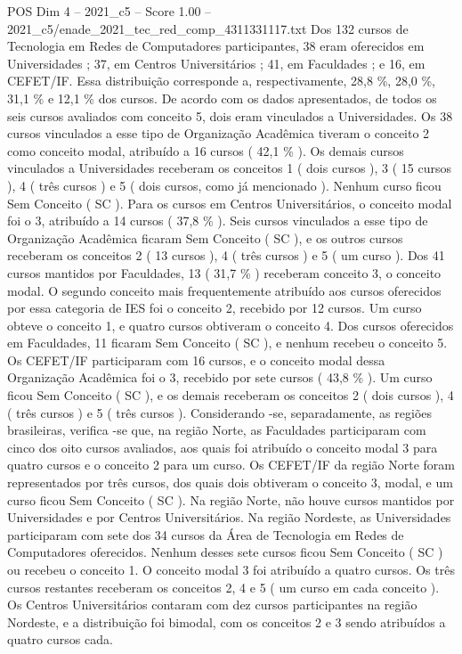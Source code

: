 \begin{textsample}{POS Dim 4 – 2021\_c5 – Score 1.00 – 2021\_c5/enade\_2021\_tec\_red\_comp\_4311331117.txt}
Dos 132 cursos de Tecnologia em Redes de Computadores participantes, 38 eram oferecidos em Universidades ; 37, em Centros Universitários ; 41, em Faculdades ; e 16, em CEFET/IF.
Essa distribuição corresponde a, respectivamente, 28,8 \%, 28,0 \%, 31,1 \% e 12,1 \% dos cursos.
De acordo com os dados apresentados, de todos os seis cursos avaliados com conceito 5, dois eram vinculados a Universidades.
Os 38 cursos vinculados a esse tipo de Organização Acadêmica tiveram o conceito 2 como conceito modal, atribuído a 16 cursos ( 42,1 \% ).
Os demais cursos vinculados a Universidades receberam os conceitos 1 ( dois cursos ), 3 ( 15 cursos ), 4 ( três cursos ) e 5 ( dois cursos, como já mencionado ).
Nenhum curso ficou Sem Conceito ( SC ).
Para os cursos em Centros Universitários, o conceito modal foi o 3, atribuído a 14 cursos ( 37,8 \% ).
Seis cursos vinculados a esse tipo de Organização Acadêmica ficaram Sem Conceito ( SC ), e os outros cursos receberam os conceitos 2 ( 13 cursos ), 4 ( três cursos ) e 5 ( um curso ).
Dos 41 cursos mantidos por Faculdades, 13 ( 31,7 \% ) receberam conceito 3, o conceito modal.
O segundo conceito mais frequentemente atribuído aos cursos oferecidos por essa categoria de IES foi o conceito 2, recebido por 12 cursos.
Um curso obteve o conceito 1, e quatro cursos obtiveram o conceito 4.
Dos cursos oferecidos em Faculdades, 11 ficaram Sem Conceito ( SC ), e nenhum recebeu o conceito 5.
Os CEFET/IF participaram com 16 cursos, e o conceito modal dessa Organização Acadêmica foi o 3, recebido por sete cursos ( 43,8 \% ).
Um curso ficou Sem Conceito ( SC ), e os demais receberam os conceitos 2 ( dois cursos ), 4 ( três cursos ) e 5 ( três cursos ).
Considerando -se, separadamente, as regiões brasileiras, verifica -se que, na região Norte, as Faculdades participaram com cinco dos oito cursos avaliados, aos quais foi atribuído o conceito modal 3 para quatro cursos e o conceito 2 para um curso.
Os CEFET/IF da região Norte foram representados por três cursos, dos quais dois obtiveram o conceito 3, modal, e um curso ficou Sem Conceito ( SC ).
Na região Norte, não houve cursos mantidos por Universidades e por Centros Universitários.
Na região Nordeste, as Universidades participaram com sete dos 34 cursos da Área de Tecnologia em Redes de Computadores oferecidos.
Nenhum desses sete cursos ficou Sem Conceito ( SC ) ou recebeu o conceito 1.
O conceito modal 3 foi atribuído a quatro cursos.
Os três cursos restantes receberam os conceitos 2, 4 e 5 ( um curso em cada conceito ).
Os Centros Universitários contaram com dez cursos participantes na região Nordeste, e a distribuição foi bimodal, com os conceitos 2 e 3 sendo atribuídos a quatro cursos cada.

\end{textsample}
